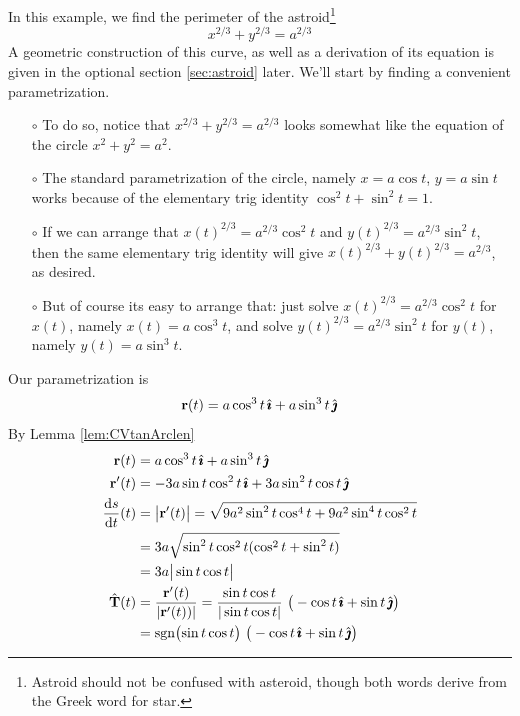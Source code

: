 \begin{eg}\label{eg:astroid}
In this example, we find the perimeter of the astroid\footnote{
Astroid should not be confused with asteroid, though both words derive 
from the Greek word for star.}
\begin{equation*}
x^{2/3}+y^{2/3} = a^{2/3}
\end{equation*}
A geometric construction of this curve, as well as a derivation of its equation is given in the optional section \ref{sec:astroid} later.  We'll start by finding a convenient
parametrization. 
\begin{itemize}\itemsep1pt \parskip0pt  %
\item[$\circ$]
To do so, notice that $x^{2/3}+y^{2/3} = a^{2/3}$ looks somewhat like the
equation of the circle $x^2+y^2=a^2$. 
\item[$\circ$]
The standard parametrization of the circle, namely
$x=a\cos t$, $y=a \sin t$ works because of the elementary trig identity $\cos^2t+\sin^2t=1$.
\item[$\circ$]
If we can arrange that $x(t)^{2/3} = a^{2/3}\cos^2 t$ and $y(t)^{2/3}=a^{2/3}\sin^2 t$, then the same elementary trig identity will give $x(t)^{2/3}+y(t)^{2/3} = a^{2/3}$, as desired. 
\item[$\circ$]
But 
of course its easy to arrange that: just solve  $x(t)^{2/3} = a^{2/3}\cos^2 t$ for $x(t)$, 
namely $x(t) = a\cos^3t$, and solve $y(t)^{2/3}=a^{2/3}\sin^2 t$ for $y(t)$,
namely $y(t)=a\sin^3 t$. 
\end{itemize}
Our parametrization is 
\begin{equation*}
\mathbf{r}(t) = a\cos^3t\,\hat{\pmb{\imath}} + a\sin^3 t\,\hat{\pmb{\jmath}}
\end{equation*}
By Lemma \ref{lem:CVtanArclen}
\begin{align*}
\vr(t) &= a\cos^3t\,\hi + a\sin^3 t\,\hj \\
\vr'(t) &= -3a\sin t\cos^2t\,\hi + 3a\sin^2 t\cos t\,\hj \\
\diff{s}{t}(t)&=\big|\vr'(t)\big| 
= \sqrt{9a^2\sin^2t\cos^4t + 9a^2\sin^4t\cos^2t} \\
& = 3a \sqrt{\sin^2t\cos^2t(\cos^2t+\sin^2t)} \\
 &=3a\big|\sin t\cos t\big| \\
\hat\vT(t) &= \frac{\vr'(t)}{|\vr'(t))|}
=  \frac{\sin t\cos t}{|\sin t\cos t|}\ \big(-\cos t\,\hi+\sin t\,\hj\big)
\\
 &=  \sgn\!\big(\!\sin t\cos t\big)\ \big(-\cos t\,\hi+\sin t\,\hj\big) 
\end{align*}

\end{eg}
